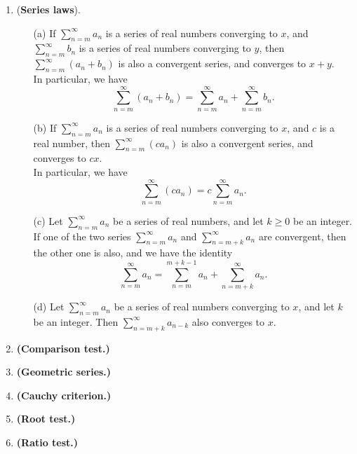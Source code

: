 \documentclass{article}
\theoremstyle{remark}
\begin{document}
\begin{enumerate}
    \item (\textbf{Series laws}).
    \begin{enumerate}
        \item[(a)] If \( \sum_{n=m}^{\infty} a_n \) is a series of real numbers converging to \( x \), and
        \( \sum_{n=m}^{\infty} b_n \) is a series of real numbers converging to \( y \), then
        \( \sum_{n=m}^{\infty} (a_n + b_n) \) is also a convergent series, and converges to \( x + y \).\\
        In particular, we have
        \[
        \sum_{n=m}^{\infty} (a_n + b_n)
        = \sum_{n=m}^{\infty} a_n + \sum_{n=m}^{\infty} b_n.
        \]

        \item[(b)] If \( \sum_{n=m}^{\infty} a_n \) is a series of real numbers converging to \( x \), and
        \( c \) is a real number, then \( \sum_{n=m}^{\infty} (c a_n) \) is also a convergent series, and
        converges to \( cx \).\\
        In particular, we have
        \[
        \sum_{n=m}^{\infty} (c a_n)
        = c \sum_{n=m}^{\infty} a_n.
        \]

        \item[(c)] Let \( \sum_{n=m}^{\infty} a_n \) be a series of real numbers, and let
        \( k \geq 0 \) be an integer. If one of the two series
        \( \sum_{n=m}^{\infty} a_n \) and \( \sum_{n=m+k}^{\infty} a_n \) are convergent,
        then the other one is also, and we have the identity
        \[
            \sum_{n=m}^{\infty} a_n
            = \sum_{n=m}^{m+k-1} a_n + \sum_{n=m+k}^{\infty} a_n.
        \]

        \item[(d)] Let \( \sum_{n=m}^{\infty} a_n \) be a series of real numbers converging to \( x \),
        and let \( k \) be an integer. Then
        \( \sum_{n=m+k}^{\infty} a_{n-k} \) also converges to \( x \).
    \end{enumerate}

    \item \textbf{(Comparison test.)}

    \item \textbf{(Geometric series.)}
    
    \item \textbf{(Cauchy criterion.)}

    \item \textbf{(Root test.)}
    
    \item \textbf{(Ratio test.)}


\end{enumerate}
\end{document}
